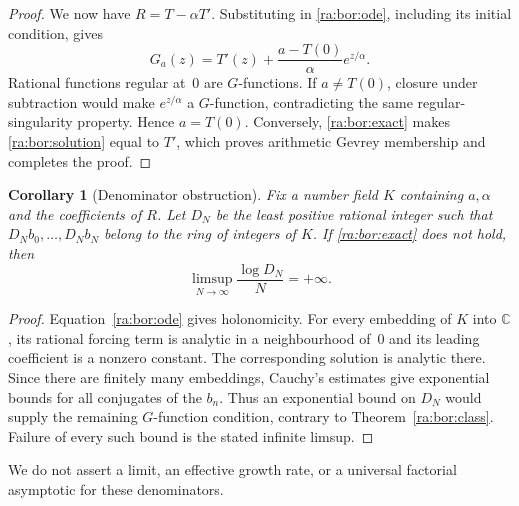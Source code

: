 \documentclass[11pt,a4paper]{article}
\newcommand{\C}{\mathbb C}
\newtheorem{corollary}[theorem]{Corollary}
\theoremstyle{definition}
\theoremstyle{remark}
\theoremstyle{plain}
\numberwithin{equation}{section}
\begin{document}
\begin{proof}
We now have $R=T-\alpha T'$.  Substituting in \eqref{ra:bor:ode}, including
its initial condition, gives
\begin{equation}\label{ra:bor:solution}
 G_a(z)=T'(z)+\frac{a-T(0)}{\alpha}e^{z/\alpha}.
\end{equation}
Rational functions regular at~$0$ are $G$-functions.  If $a\ne T(0)$,
closure under subtraction would make $e^{z/\alpha}$ a $G$-function,
contradicting the same regular-singularity property.  Hence $a=T(0)$.
Conversely, \eqref{ra:bor:exact} makes \eqref{ra:bor:solution} equal to $T'$,
which proves arithmetic Gevrey membership and completes the proof.
\end{proof}

\begin{corollary}[Denominator obstruction]\label{ra:bor:denominator}
Fix a number field $K$ containing $a,\alpha$ and the coefficients of $R$.
Let $D_N$ be the least positive rational integer such that
$D_Nb_0,\ldots,D_Nb_N$ belong to the ring of integers of $K$.
If \eqref{ra:bor:exact} does not hold, then
\[
 \limsup_{N\to\infty}\frac{\log D_N}{N}=+\infty.
\]
\end{corollary}
\begin{proof}
Equation~\eqref{ra:bor:ode} gives holonomicity.  For every embedding of $K$
into $\C$, its rational forcing term is analytic in a neighbourhood
of~$0$ and its leading coefficient is a nonzero constant.  The
corresponding solution is analytic there.  Since there are finitely
many embeddings, Cauchy's estimates give exponential bounds for all
conjugates of the $b_n$.  Thus an exponential bound on $D_N$ would supply
the remaining $G$-function condition, contrary to Theorem~\ref{ra:bor:class}.
Failure of every such bound is the stated infinite limsup.
\end{proof}
We do not assert a limit, an effective growth rate, or a universal
factorial asymptotic for these denominators.
\end{document}
